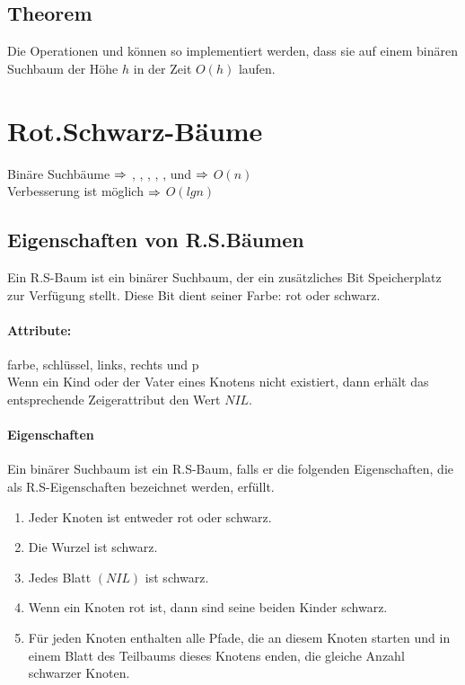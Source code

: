 \documentclass[a4paper,twoside,DIV15,BCOR12mm]{scrbook}
\begin{document}
\subsection{Theorem}

Die Operationen  und  können so implementiert werden, dass sie auf einem binären Suchbaum der Höhe $h$
in der Zeit $O(h)$ laufen.

\section{Rot.Schwarz-Bäume}

Binäre Suchbäume $\Rightarrow$ , , , , ,  und 
 $\Rightarrow$ $O(n)$ \\
Verbesserung ist möglich $\Rightarrow$ $O(lgn)$

\subsection{Eigenschaften von R.S.Bäumen}

Ein R.S-Baum ist ein binärer Suchbaum, der ein zusätzliches Bit Speicherplatz zur Verfügung stellt. Diese Bit dient seiner
Farbe: rot oder schwarz.


\paragraph{Attribute:}

farbe, schlüssel, links, rechts und p \\
Wenn ein Kind oder der Vater eines Knotens nicht existiert, dann erhält das entsprechende Zeigerattribut den Wert $NIL$.

\paragraph{Eigenschaften}

Ein binärer Suchbaum ist ein R.S-Baum, falls er die folgenden Eigenschaften, die als R.S-Eigenschaften bezeichnet werden,
erfüllt.
\begin{enumerate}
\item Jeder Knoten ist entweder rot oder schwarz.
\item Die Wurzel ist schwarz.
\item Jedes Blatt $(NIL)$ ist schwarz.
\item Wenn ein Knoten rot ist, dann sind seine beiden Kinder schwarz.
\item Für jeden Knoten enthalten alle Pfade, die an diesem Knoten starten und in einem Blatt des Teilbaums dieses Knotens enden,
die gleiche Anzahl schwarzer Knoten.
\end{enumerate}
\end{document}
